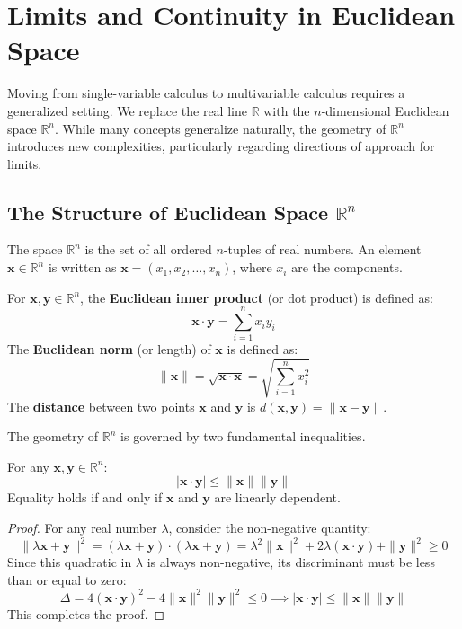 \section{Limits and Continuity in Euclidean Space}

Moving from single-variable calculus to multivariable calculus requires a generalized setting. We replace the real line $\mathbb{R}$ with the $n$-dimensional Euclidean space $\mathbb{R}^n$. While many concepts generalize naturally, the geometry of $\mathbb{R}^n$ introduces new complexities, particularly regarding directions of approach for limits.

\subsection{The Structure of Euclidean Space $\mathbb{R}^n$}

The space $\mathbb{R}^n$ is the set of all ordered $n$-tuples of real numbers. An element $\mathbf{x} \in \mathbb{R}^n$ is written as $\mathbf{x} = (x_1, x_2, \dots, x_n)$, where $x_i$ are the components.

\begin{definition}
For $\mathbf{x}, \mathbf{y} \in \mathbb{R}^n$, the \textbf{Euclidean inner product} (or dot product) is defined as:
\[ \mathbf{x} \cdot \mathbf{y} = \sum_{i=1}^n x_i y_i \]
The \textbf{Euclidean norm} (or length) of $\mathbf{x}$ is defined as:
\[ \|\mathbf{x}\| = \sqrt{\mathbf{x} \cdot \mathbf{x}} = \sqrt{\sum_{i=1}^n x_i^2} \]
The \textbf{distance} between two points $\mathbf{x}$ and $\mathbf{y}$ is $d(\mathbf{x}, \mathbf{y}) = \|\mathbf{x} - \mathbf{y}\|$.
\end{definition}

The geometry of $\mathbb{R}^n$ is governed by two fundamental inequalities.

\begin{theorem}
For any $\mathbf{x}, \mathbf{y} \in \mathbb{R}^n$:
\[ |\mathbf{x} \cdot \mathbf{y}| \le \|\mathbf{x}\| \|\mathbf{y}\| \]
Equality holds if and only if $\mathbf{x}$ and $\mathbf{y}$ are linearly dependent.
\end{theorem}

\begin{proof}
For any real number $\lambda$, consider the non-negative quantity:
\[ \|\lambda \mathbf{x} + \mathbf{y}\|^2 = (\lambda \mathbf{x} + \mathbf{y}) \cdot (\lambda \mathbf{x} + \mathbf{y}) = \lambda^2 \|\mathbf{x}\|^2 + 2\lambda (\mathbf{x} \cdot \mathbf{y}) + \|\mathbf{y}\|^2 \ge 0 \]
Since this quadratic in $\lambda$ is always non-negative, its discriminant must be less than or equal to zero:
\[ \Delta = 4(\mathbf{x} \cdot \mathbf{y})^2 - 4\|\mathbf{x}\|^2 \|\mathbf{y}\|^2 \le 0 \implies |\mathbf{x} \cdot \mathbf{y}| \le \|\mathbf{x}\| \|\mathbf{y}\| \]
This completes the proof.
\end{proof}

